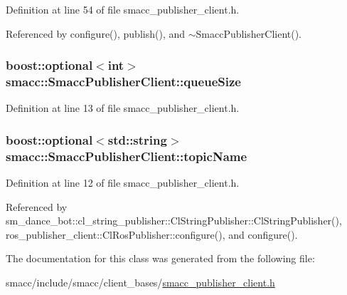 Definition at line 54 of file smacc\+\_\+publisher\+\_\+client.\+h.



Referenced by configure(), publish(), and $\sim$\+Smacc\+Publisher\+Client().

\subsubsection[{\texorpdfstring{queue\+Size}{queueSize}}]{\setlength{\rightskip}{0pt plus 5cm}boost\+::optional$<$int$>$ smacc\+::\+Smacc\+Publisher\+Client\+::queue\+Size}\hypertarget{classsmacc_1_1SmaccPublisherClient_ad7a0aa074031d2c2ea332a4d517dbae5}{}\label{classsmacc_1_1SmaccPublisherClient_ad7a0aa074031d2c2ea332a4d517dbae5}


Definition at line 13 of file smacc\+\_\+publisher\+\_\+client.\+h.

\subsubsection[{\texorpdfstring{topic\+Name}{topicName}}]{\setlength{\rightskip}{0pt plus 5cm}boost\+::optional$<$std\+::string$>$ smacc\+::\+Smacc\+Publisher\+Client\+::topic\+Name}\hypertarget{classsmacc_1_1SmaccPublisherClient_a4b8401543c3d532e81453c9106ddaefc}{}\label{classsmacc_1_1SmaccPublisherClient_a4b8401543c3d532e81453c9106ddaefc}


Definition at line 12 of file smacc\+\_\+publisher\+\_\+client.\+h.



Referenced by sm\+\_\+dance\+\_\+bot\+::cl\+\_\+string\+\_\+publisher\+::\+Cl\+String\+Publisher\+::\+Cl\+String\+Publisher(), ros\+\_\+publisher\+\_\+client\+::\+Cl\+Ros\+Publisher\+::configure(), and configure().



The documentation for this class was generated from the following file\+:\begin{DoxyCompactItemize}
\item 
smacc/include/smacc/client\+\_\+bases/\hyperlink{smacc__publisher__client_8h}{smacc\+\_\+publisher\+\_\+client.\+h}\end{DoxyCompactItemize}
